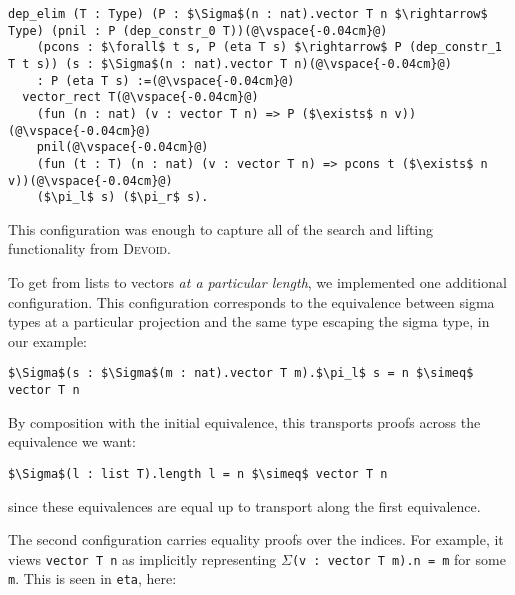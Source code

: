 \begin{lstlisting}[backgroundcolor=\color{cyan!30}]
dep_elim (T : Type) (P : $\Sigma$(n : nat).vector T n $\rightarrow$ Type) (pnil : P (dep_constr_0 T))(@\vspace{-0.04cm}@)
    (pcons : $\forall$ t s, P (eta T s) $\rightarrow$ P (dep_constr_1 T t s)) (s : $\Sigma$(n : nat).vector T n)(@\vspace{-0.04cm}@)
    : P (eta T s) :=(@\vspace{-0.04cm}@)
  vector_rect T(@\vspace{-0.04cm}@)
    (fun (n : nat) (v : vector T n) => P ($\exists$ n v))(@\vspace{-0.04cm}@)
    pnil(@\vspace{-0.04cm}@)
    (fun (t : T) (n : nat) (v : vector T n) => pcons t ($\exists$ n v))(@\vspace{-0.04cm}@)
    ($\pi_l$ s) ($\pi_r$ s).
\end{lstlisting}
This configuration was enough to capture all of the search and lifting functionality from \textsc{Devoid}. %

To get from lists to vectors \textit{at a particular length}, we implemented one additional configuration.
This configuration corresponds to the equivalence between sigma types at a particular projection
and the same type escaping the sigma type, in our example:

\begin{lstlisting}
$\Sigma$(s : $\Sigma$(m : nat).vector T m).$\pi_l$ s = n $\simeq$ vector T n
\end{lstlisting}
By composition with the initial equivalence, this transports proofs
across the equivalence we	 want:

\begin{lstlisting}
$\Sigma$(l : list T).length l = n $\simeq$ vector T n
\end{lstlisting}
since these equivalences are equal up to transport along the first equivalence.

The second configuration carries equality proofs over the indices.
For example, it views \lstinline{vector T n} as implicitly representing $\Sigma$\lstinline{(v : vector T m).n = m} for some \lstinline{m}.
This is seen in \lstinline{eta}, here: 

